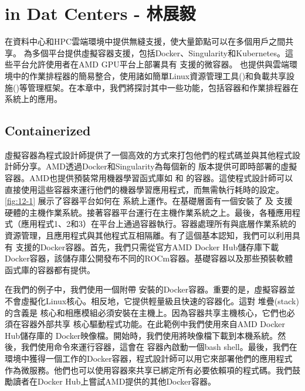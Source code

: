 \chapter{ in Dat Centers - 林展毅}

 在資料中心和HPC雲端環境中提供無縫支援，使大量節點可以在多個用戶之間共享。 為多個平台提供虛擬容器支援，包括Docker、Singularity和Kubernetes。這些平台允許使用者在AMD GPU平台上部署具有  支援的微容器。 也提供與雲端環境中的作業排程器的簡易整合，使用諸如簡單Linux資源管理工具()和負載共享設施()等管理框架。在本章中，我們將探討其中一些功能，包括容器和作業排程器在  系統上的應用。

\section{Containerized }

 虛擬容器為程式設計師提供了一個高效的方式來打包他們的程式碼並與其他程式設計師分享。AMD透過Docker和Singularity為每個新的  版本提供可即時部署的虛擬容器。AMD也提供預裝常用機器學習函式庫如  和  的容器。這使程式設計師可以直接使用這些容器來運行他們的機器學習應用程式，而無需執行耗時的設定。\autoref{fig:12-1} 展示了容器平台如何在  系統上運作。在基礎層面有一個安裝了  及  支援硬體的主機作業系統。接著容器平台運行在主機作業系統之上。最後，各種應用程式（應用程式1、2和3）在平台上通過容器執行。容器處理所有與底層作業系統的資源管理，且應用程式與其他程式互相隔離。有了這個基本認知，我們可以利用具有  支援的Docker容器。首先，我們只需從官方AMD Docker Hub儲存庫下載Docker容器，該儲存庫公開發布不同的ROCm容器。基礎容器以及那些預裝軟體函式庫的容器都有提供。

在我們的例子中，我們使用一個附帶  安裝的Docker容器。重要的是，虛擬容器並不會虛擬化Linux核心。相反地，它提供輕量級且快速的容器化。這對  堆疊(stack)的含義是  核心和相應模組必須安裝在主機上。因為容器共享主機核心，它們也必須在容器外部共享  核心驅動程式功能。在此範例中我們使用來自AMD Docker Hub儲存庫的  Docker映像檔。開始時，我們使用將映像檔下載到本機系統。然後，我們使用命令來運行容器，這會在 容器內啟動一個bash shell。最後，我們在  環境中獲得一個工作的Docker容器，程式設計師可以用它來部署他們的應用程式作為微服務。他們也可以使用容器來共享已綁定所有必要依賴項的程式碼。我們鼓勵讀者在Docker Hub上嘗試AMD提供的其他Docker容器。

